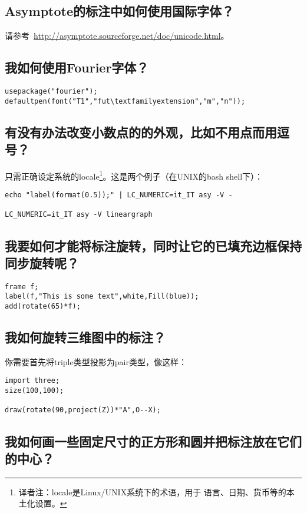 \subsection{\label{Q4.4}Asymptote的标注中如何使用国际字体？}
请参考~\url{http://asymptote.sourceforge.net/doc/unicode.html}。

\subsection{\label{Q4.5}我如何使用Fourier字体？}

\begin{lstlisting}
usepackage("fourier");
defaultpen(font("T1","fut\textfamilyextension","m","n"));
\end{lstlisting}

\subsection{\label{Q4.6}有没有办法改变小数点的的外观，比如不用点而用逗号？}
只需正确设定系统的locale\footnote{译者注：locale是Linux/UNIX系统下的术语，用于
语言、日期、货币等的本土化设置。}。这是两个例子（在UNIX的bash shell下）：
\begin{verbatim}
echo "label(format(0.5));" | LC_NUMERIC=it_IT asy -V -

LC_NUMERIC=it_IT asy -V lineargraph 
\end{verbatim}

\subsection{\label{Q4.7}我要如何才能将标注旋转，同时让它的已填充边框保持同步旋转呢？}
\begin{lstlisting}
frame f;
label(f,"This is some text",white,Fill(blue));
add(rotate(65)*f);
\end{lstlisting}

\subsection{\label{Q4.8}我如何旋转三维图中的标注？}
你需要首先将triple类型投影为pair类型，像这样：

\begin{lstlisting}
import three;
size(100,100);

draw(rotate(90,project(Z))*"A",O--X);
\end{lstlisting}

\subsection{\label{Q4.9}我如何画一些固定尺寸的正方形和圆并把标注放在它们的中心？}

